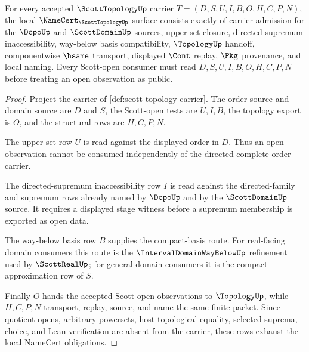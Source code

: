 \begin{theorem}
\label{thm:scott-topology-namecert-obligations}
For every accepted $\ScottTopologyUp$ carrier $T=(D,S,U,I,B,O,H,C,P,N)$, the local $\NameCert_{\ScottTopologyUp}$ surface consists exactly of carrier admission for the $\DcpoUp$ and $\ScottDomainUp$ sources, upper-set closure, directed-supremum inaccessibility, way-below basis compatibility, $\TopologyUp$ handoff, componentwise $\hsame$ transport, displayed $\Cont$ replay, $\Pkg$ provenance, and local naming. Every Scott-open consumer must read $D,S,U,I,B,O,H,C,P,N$ before treating an open observation as public.
\end{theorem}
\begin{proof}
Project the carrier of \autoref{def:scott-topology-carrier}. The order source and domain source are $D$ and $S$, the Scott-open tests are $U,I,B$, the topology export is $O$, and the structural rows are $H,C,P,N$.

The upper-set row $U$ is read against the displayed order in $D$. Thus an open observation cannot be consumed independently of the directed-complete order carrier.

The directed-supremum inaccessibility row $I$ is read against the directed-family and supremum rows already named by $\DcpoUp$ and by the $\ScottDomainUp$ source. It requires a displayed stage witness before a supremum membership is exported as open data.

The way-below basis row $B$ supplies the compact-basis route. For real-facing domain consumers this route is the $\IntervalDomainWayBelowUp$ refinement used by $\ScottRealUp$; for general domain consumers it is the compact approximation row of $S$.

Finally $O$ hands the accepted Scott-open observations to $\TopologyUp$, while $H,C,P,N$ transport, replay, source, and name the same finite packet. Since quotient opens, arbitrary powersets, host topological equality, selected suprema, choice, and Lean verification are absent from the carrier, these rows exhaust the local NameCert obligations.
\end{proof}


